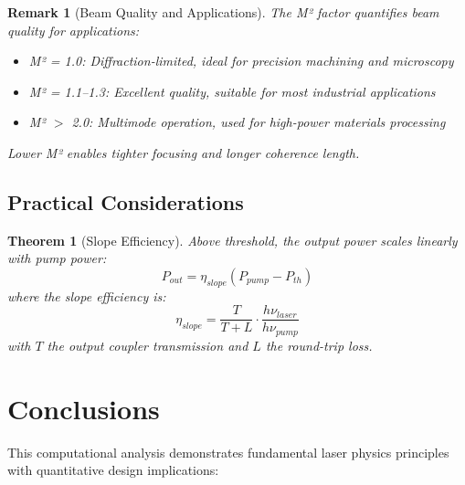\documentclass[a4paper, 11pt]{article}
\newtheorem{theorem}{Theorem}[section]
\newtheorem{remark}{Remark}[section]
\begin{document}
\begin{remark}[Beam Quality and Applications]
The M² factor quantifies beam quality for applications:
\begin{itemize}
\item M² = 1.0: Diffraction-limited, ideal for precision machining and microscopy
\item M² = 1.1--1.3: Excellent quality, suitable for most industrial applications
\item M² $>$ 2.0: Multimode operation, used for high-power materials processing
\end{itemize}
Lower M² enables tighter focusing and longer coherence length.
\end{remark}

\subsection{Practical Considerations}

\begin{theorem}[Slope Efficiency]
Above threshold, the output power scales linearly with pump power:
\begin{equation}
P_{out} = \eta_{slope} (P_{pump} - P_{th})
\end{equation}
where the slope efficiency is:
\begin{equation}
\eta_{slope} = \frac{T}{T + L} \cdot \frac{h\nu_{laser}}{h\nu_{pump}}
\end{equation}
with $T$ the output coupler transmission and $L$ the round-trip loss.
\end{theorem}

\section{Conclusions}

This computational analysis demonstrates fundamental laser physics principles with quantitative
design implications:
\end{document}
